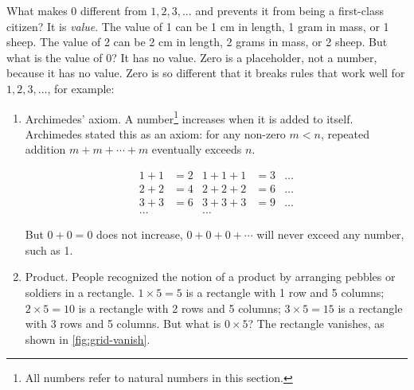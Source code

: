\documentclass[b5paper]{article}
\begin{document}
What makes 0 different from $1, 2, 3, \dotsc$ and prevents it from being a first-class citizen? It is \emph{value}. The value of 1 can be 1 cm in length, 1 gram in mass, or 1 sheep. The value of 2 can be 2 cm in length, 2 grams in mass, or 2 sheep. But what is the value of 0? It has no value. Zero is a placeholder, not a number, because it has no value\cite{Seife-2000}. Zero is so different that it breaks rules that work well for $1, 2, 3, \dotsc$, for example:

\label{sec:archimedes-axiom} \label{sec:mul-as-zoom}
\begin{enumerate}[1)]
\item Archimedes' axiom. A number\footnote{All numbers refer to natural numbers in this section.} increases when it is added to itself. Archimedes stated this as an axiom: for any non-zero $m < n$, repeated addition $m + m + \dotsb + m$ eventually exceeds $n$. 

\begin{align*}
1 + 1 &= 2   & 1 + 1 + 1 &= 3 & \dots \\
2 + 2 &= 4   & 2 + 2 + 2 &= 6 & \dots \\
3 + 3 &= 6   & 3 + 3 + 3 &= 9 & \dots \\
\dots &      & \dots     &    &
\end{align*}

But $0 + 0 = 0$ does not increase, $0 + 0 + 0 + \cdots$ will never exceed any number, such as 1.

\item Product. People recognized the notion of a product by arranging pebbles or soldiers in a rectangle. $1 \times 5 = 5$ is a rectangle with 1 row and 5 columns; $2 \times 5 = 10$ is a rectangle with 2 rows and 5 columns; $3 \times 5 = 15$ is a rectangle with 3 rows and 5 columns. But what is $0 \times 5$? The rectangle vanishes, as shown in \cref{fig:grid-vanish}.

\begin{figure}[htbp]
 \centering
\end{figure}
\end{enumerate}
\end{document}

